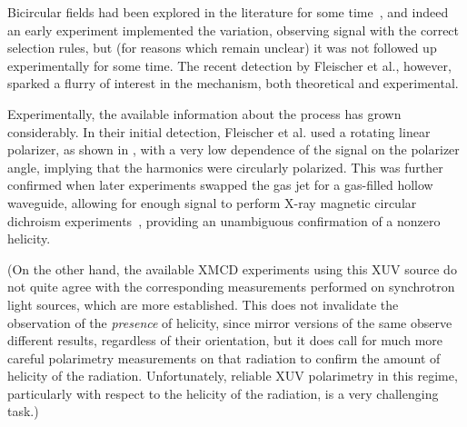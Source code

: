 Bicircular fields had been explored in the literature for some time~\cite{ EichmannExperiment, SFALong, SFAMilosevic, milosevic_bicircular-hhg_2000, SFAMilosevicBecker, milosevic_unusual-nonlinear-polarization_2000, milosevic_hhg-laser-phys_2001, averbukh_stability_2002, SFACeccherini, MilosevicIsolatedPulses}, and indeed an early experiment \cite{EichmannExperiment} implemented the variation, observing signal with the correct selection rules, but (for reasons which remain unclear) it was not followed up experimentally for some time. The recent detection by Fleischer et al., however, sparked a flurry of interest in the mechanism, both theoretical and experimental.


Experimentally, the available information about the process has grown considerably. In their initial detection, Fleischer et al. used a rotating linear polarizer, as shown in , with a very low dependence of the signal on the polarizer angle, implying that the harmonics were circularly polarized. This was further confirmed when later experiments swapped the gas jet for a gas-filled hollow waveguide, allowing for enough signal to perform X-ray magnetic circular dichroism experiments~\cite{kfir_generation_2015, fan_bright-circularly_2015}, providing an unambiguous confirmation of a nonzero helicity.

(On the other hand, the available XMCD experiments using this XUV source do not quite agree with the corresponding measurements performed on synchrotron light sources, which are more established. This does not invalidate the observation of the \textit{presence} of helicity, since mirror versions of the same observe different results, regardless of their orientation, but it does call for much more careful polarimetry measurements on that radiation to confirm the amount of helicity of the radiation. Unfortunately, reliable XUV polarimetry in this regime, particularly with respect to the helicity of the radiation, is a very challenging task.)




